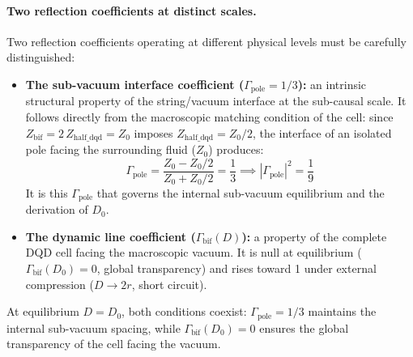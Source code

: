 \documentclass[11pt,a4paper]{article}
\theoremstyle{plain}
\theoremstyle{remark}
\begin{document}
\paragraph{Two reflection coefficients at distinct scales.}
Two reflection coefficients operating at different physical levels must be carefully distinguished:
\begin{itemize}
    \item \textbf{The sub-vacuum interface coefficient ($\Gamma_{\text{pole}} = 1/3$):} an intrinsic structural property of the string/vacuum interface at the sub-causal scale. It follows directly from the macroscopic matching condition of the cell: since $Z_{\text{bif}} = 2\,Z_{\text{half\_dqd}} = Z_0$ imposes $Z_{\text{half\_dqd}} = Z_0/2$, the interface of an isolated pole facing the surrounding fluid ($Z_0$) produces:
    \begin{equation}
    \Gamma_{\text{pole}} =
    \frac{Z_0 - Z_0/2}{Z_0 + Z_0/2} = \frac{1}{3}
    \implies |\Gamma_{\text{pole}}|^2 = \frac{1}{9}
    \end{equation}
    It is this $\Gamma_{\text{pole}}$ that governs the internal sub-vacuum equilibrium and the derivation of $D_0$.

    \item \textbf{The dynamic line coefficient ($\Gamma_{\text{bif}}(D)$):} a property of the complete DQD cell facing the macroscopic vacuum. It is null at equilibrium ($\Gamma_{\text{bif}}(D_0) = 0$, global transparency) and rises toward 1 under external compression ($D \rightarrow 2r$, short circuit).
\end{itemize}
At equilibrium $D = D_0$, both conditions coexist: $\Gamma_{\text{pole}} = 1/3$ maintains the internal sub-vacuum spacing, while $\Gamma_{\text{bif}}(D_0) = 0$ ensures the global transparency of the cell facing the vacuum.
\end{document}
